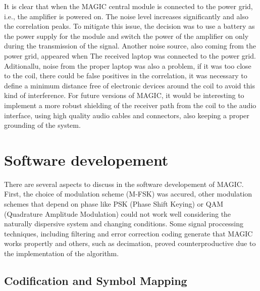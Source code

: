 It is clear that when the MAGIC central module is connected to the power grid, i.e., the amplifier is powered on. The noise level increases significantly and also the correlation peaks.
\newp
To mitigate this issue, the decision was to use a battery as the power supply for the module and switch the power of the amplifier on only during the transmission of the signal.
\newp
Another noise source, also coming from the power grid, appeared when The received laptop was connected to the power grid. Aditionallu, noise from the proper laptop was also a problem, if it was too close to the coil, there could be false positives in the correlation, it was necessary to define a minimum distance free of electronic devices around the coil to avoid this kind of interference. For future versions of MAGIC, it would be interesting to implement a more robust shielding of the receiver path from the coil to the audio interface, using high quality audio cables and connectors, also keeping a proper grounding of the system.

 


\section{Software developement}

There are several aspects to discuss in the software developement of MAGIC. First, the choice of modulation scheme (M-FSK) was accured, other modulation schemes that depend on phase like PSK (Phase Shift Keying) or QAM (Quadrature Amplitude Modulation) could not work well considering the naturally dispersive system and changing conditions. Some signal proccessing techniques, including filtering and error correction coding generate that MAGIC works propertly and others, such as decimation, proved counterproductive due to the implementation of the algorithm.

\subsection{Codification and Symbol Mapping}\label{subsec: Analysis-codification}

